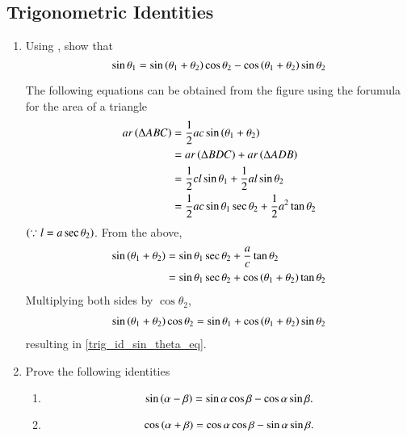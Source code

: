 \subsection{Trigonometric Identities}
\begin{enumerate}[label=\thesubsection.\arabic*.,ref=\thesubsection.\theenumi]
\item
	Using 
	,
show that 
\begin{equation}
\label{trig_id_sin_theta_eq}
\sin  \theta_1 = \sin \left(\theta_1 + \theta_2\right)\cos \theta_2 - \cos\left(\theta_1+\theta_2\right)\sin\theta_2
\end{equation}	
\iffalse
\begin{figure}[!ht]
	\begin{center}
		
		\resizebox{0.6\columnwidth}{!}{}
	\end{center}
	\caption{$\sin \brak{\theta_1+\theta_2} = \sin\theta_1\cos\theta_2 + \cos\theta_1\sin\theta_2$}
	\label{trig_id_sin_theta}	
\end{figure}
\fi
%

\solution The following equations can be obtained from the figure using the forumula for the area of a triangle
%
\begin{align}
ar \left(\Delta ABC\right) &= \frac{1}{2}ac \sin\left(\theta_1 + \theta_2\right) \\
&= ar \left(\Delta BDC\right) + ar \left(\Delta ADB\right) \\
&= \frac{1}{2}cl \sin{\theta_1} + \frac{1}{2}al \sin{\theta_2} \\ 
&= \frac{1}{2}ac \sin{\theta_1} \sec \theta_2 + \frac{1}{2}a^2 \tan{\theta_2} 
\end{align}
$\left(\because
	l = a \sec \theta_2\right)$.  From the above,
\begin{align}
\sin\left(\theta_1 + \theta_2\right) &=  \sin{\theta_1} \sec \theta_2 + \frac{a}{c} \tan{\theta_2} \\
	&=  \sin{\theta_1} \sec \theta_2 
+ \cos\left(\theta_1 + \theta_2\right) \tan{\theta_2} 
\end{align}
Multiplying both sides by $\cos \theta_2$,
\begin{align}
\sin\left(\theta_1 + \theta_2\right)\cos{\theta_2} =  \sin{\theta_1}  
+ \cos\left(\theta_1 + \theta_2\right) \sin\theta_2  
\end{align}
%
resulting in
\eqref{trig_id_sin_theta_eq}.
\item
	Prove the following identities 
	\begin{enumerate}
\item 
\begin{equation}
		\label{trig_id_sin_diff}
\sin\left(\alpha - \beta\right) = \sin \alpha \cos \beta - \cos \alpha \sin \beta.
\end{equation}
\item 
\begin{equation}
\cos\left(\alpha + \beta\right) = \cos \alpha \cos \beta - \sin \alpha \sin \beta.
		\label{trig_id_cos_diff}
\end{equation}


\end{enumerate}
\end{enumerate}
